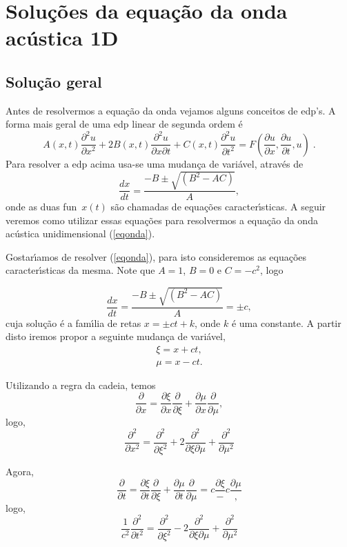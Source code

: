 \section{Solu\c{c}\~oes da equa\c{c}\~ao da onda ac\'ustica 1D}

\subsection{Solu\c{c}\~ao geral}

Antes de resolvermos a equa\c{c}\~ao da onda vejamos alguns conceitos
de edp's. A forma mais geral de uma edp linear de segunda ordem \'e
\[
A(x,t) \frac{\partial^{2}u}{\partial x^{2}}+2B(x,t)
\frac{\partial^{2}u}{\partial x \partial t}+ C(x,t)
\frac{\partial^{2}u}{\partial t^{2}} = 
F\left(\frac{\partial u}{\partial x},\frac{\partial u}{\partial t},u
\right)\; .
\]
Para resolver a edp
acima usa-se uma mudan\c{c}a de vari\'avel, atrav\'es de
\[
\frac{dx}{dt}=\frac{-B\pm\sqrt{(B^{2}-AC)}}{A},
\]
onde as duas fun\coes\ $x(t)$
 s\~ao chamadas de equa\c{c}\~oes
caracter\'\i sticas. A seguir veremos como
 utilizar essas
equa\c{c}\~oes para resolvermos a equa\c{c}\~ao da
 onda ac\'ustica
unidimensional (\ref{eqonda}).


Gostar\'\i amos de resolver (\ref{eqonda}), para isto consideremos
 as
equa\c{c}\~oes caracter\'\i sticas da mesma. Note que $A=1$, $B=0$ e
$C=-c^{2}$, logo

\[
\frac{dx}{dt} = \frac{-B\pm\sqrt{(B^{2}-AC)}}{A} = \pm c,
\]
cuja solu\c{c}\~ao \'e a fam\'\i lia de retas $x=\pm
ct+k$, onde $k$ \'e uma constante. A partir disto
 iremos propor a
seguinte mudan\c{c}a de vari\'avel,
\begin{eqnarray*}
\xi=x+ct, \\
\mu=x-ct.
\end{eqnarray*}

Utilizando a regra da cadeia, temos
\[\frac{\partial}{\partial x}=\frac{\partial \xi}{\partial x}\frac{\partial}{\partial \xi}+
\frac{\partial \mu}{\partial x}\frac{\partial}{\partial \mu},\]
logo,
\begin{equation}\label{d2x}
\frac{\partial^{2}}{\partial x^{2}}=\frac{\partial^{2}}{\partial
\xi^{2}}+2\frac{\partial^{2}}{\partial \xi \partial \mu}+
\frac{\partial^{2}}{\partial \mu^{2}}
\end{equation}

Agora,
\[\frac{\partial}{\partial t}=\frac{\partial \xi}{\partial t}\frac{\partial}{\partial \xi}+
\frac{\partial \mu}{\partial t}\frac{\partial}{\partial \mu}=c\frac{\partial \xi}-c\frac{\partial \mu},\]
logo,
\begin{equation}\label{d2t}
\frac{1}{c^{2}}\frac{\partial^{2}}{\partial
t^{2}}=\frac{\partial^{2}}{\partial
\xi^{2}}-2\frac{\partial^{2}}{\partial \xi \partial \mu}+
\frac{\partial^{2}}{\partial \mu^{2}}
\end{equation}

